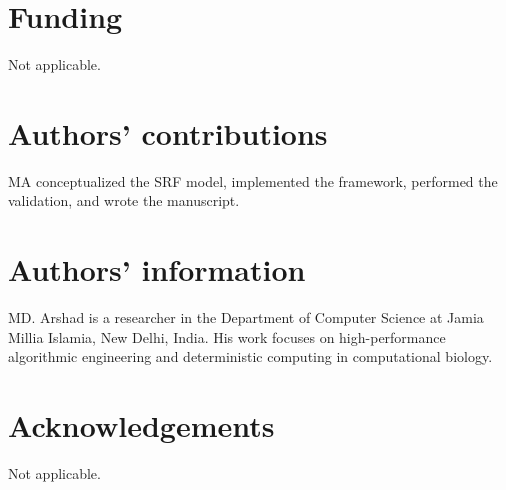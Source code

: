 \documentclass{bmcart}
\begin{document}
\begin{backmatter}
\section*{Funding}
Not applicable.

\section*{Authors' contributions}
MA conceptualized the SRF model, implemented the framework, performed the validation, and wrote the manuscript.

\section*{Authors' information}
MD. Arshad is a researcher in the Department of Computer Science at Jamia Millia Islamia, New Delhi, India. His work focuses on high-performance algorithmic engineering and deterministic computing in computational biology.

\section*{Acknowledgements}
Not applicable.

\end{backmatter}
\end{document}
